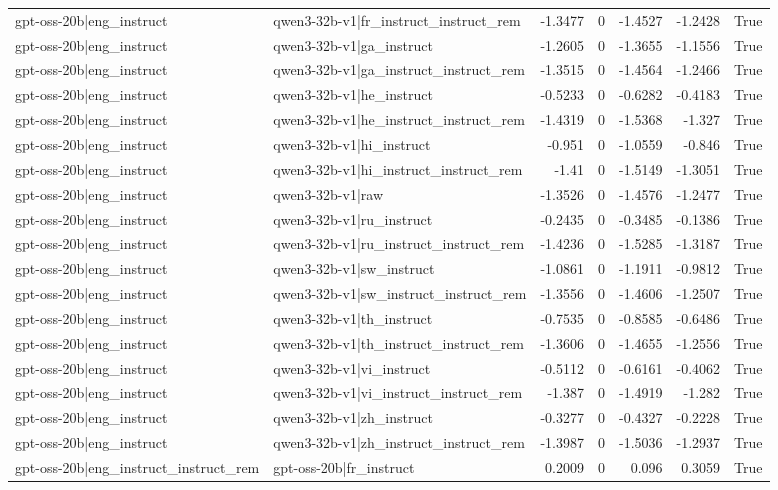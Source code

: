 \begin{table}
\begin{tabular}{l l r r r r l}
gpt-oss-20b|eng_instruct & qwen3-32b-v1|fr_instruct_instruct_rem & -1.3477 & 0 & -1.4527 & -1.2428 & True \\
gpt-oss-20b|eng_instruct & qwen3-32b-v1|ga_instruct & -1.2605 & 0 & -1.3655 & -1.1556 & True \\
gpt-oss-20b|eng_instruct & qwen3-32b-v1|ga_instruct_instruct_rem & -1.3515 & 0 & -1.4564 & -1.2466 & True \\
gpt-oss-20b|eng_instruct & qwen3-32b-v1|he_instruct & -0.5233 & 0 & -0.6282 & -0.4183 & True \\
gpt-oss-20b|eng_instruct & qwen3-32b-v1|he_instruct_instruct_rem & -1.4319 & 0 & -1.5368 & -1.327 & True \\
gpt-oss-20b|eng_instruct & qwen3-32b-v1|hi_instruct & -0.951 & 0 & -1.0559 & -0.846 & True \\
gpt-oss-20b|eng_instruct & qwen3-32b-v1|hi_instruct_instruct_rem & -1.41 & 0 & -1.5149 & -1.3051 & True \\
gpt-oss-20b|eng_instruct & qwen3-32b-v1|raw & -1.3526 & 0 & -1.4576 & -1.2477 & True \\
gpt-oss-20b|eng_instruct & qwen3-32b-v1|ru_instruct & -0.2435 & 0 & -0.3485 & -0.1386 & True \\
gpt-oss-20b|eng_instruct & qwen3-32b-v1|ru_instruct_instruct_rem & -1.4236 & 0 & -1.5285 & -1.3187 & True \\
gpt-oss-20b|eng_instruct & qwen3-32b-v1|sw_instruct & -1.0861 & 0 & -1.1911 & -0.9812 & True \\
gpt-oss-20b|eng_instruct & qwen3-32b-v1|sw_instruct_instruct_rem & -1.3556 & 0 & -1.4606 & -1.2507 & True \\
gpt-oss-20b|eng_instruct & qwen3-32b-v1|th_instruct & -0.7535 & 0 & -0.8585 & -0.6486 & True \\
gpt-oss-20b|eng_instruct & qwen3-32b-v1|th_instruct_instruct_rem & -1.3606 & 0 & -1.4655 & -1.2556 & True \\
gpt-oss-20b|eng_instruct & qwen3-32b-v1|vi_instruct & -0.5112 & 0 & -0.6161 & -0.4062 & True \\
gpt-oss-20b|eng_instruct & qwen3-32b-v1|vi_instruct_instruct_rem & -1.387 & 0 & -1.4919 & -1.282 & True \\
gpt-oss-20b|eng_instruct & qwen3-32b-v1|zh_instruct & -0.3277 & 0 & -0.4327 & -0.2228 & True \\
gpt-oss-20b|eng_instruct & qwen3-32b-v1|zh_instruct_instruct_rem & -1.3987 & 0 & -1.5036 & -1.2937 & True \\
gpt-oss-20b|eng_instruct_instruct_rem & gpt-oss-20b|fr_instruct & 0.2009 & 0 & 0.096 & 0.3059 & True \\

\end{tabular}
\end{table}
